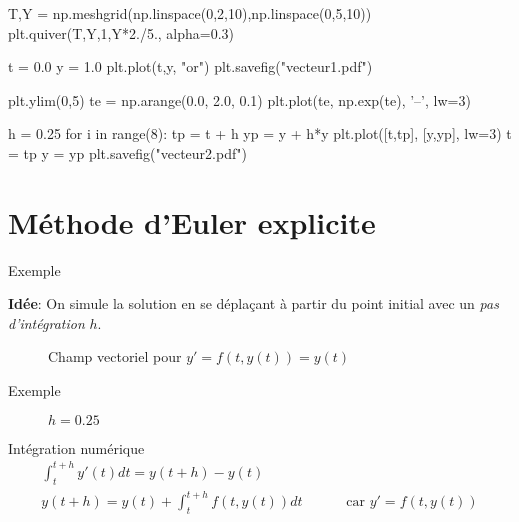 \documentclass{beamer}
\begin{document}
\begin{pycode}
    T,Y = np.meshgrid(np.linspace(0,2,10),np.linspace(0,5,10))
    plt.quiver(T,Y,1,Y*2./5., alpha=0.3)

    t = 0.0
    y = 1.0
    plt.plot(t,y, "or")
    plt.savefig("vecteur1.pdf")

    plt.ylim(0,5)
    te = np.arange(0.0, 2.0, 0.1)
    plt.plot(te, np.exp(te), '--', lw=3)

    h = 0.25
    for i in range(8):
        tp = t + h
        yp = y + h*y
        plt.plot([t,tp], [y,yp], lw=3)
        t = tp
        y = yp
    plt.savefig("vecteur2.pdf")
\end{pycode}

\section{Méthode d'Euler explicite}

\begin{frame}{Exemple}

    \textbf{Idée}: On simule la solution en se déplaçant à partir du point initial avec un \emph{pas d'intégration} $h$.

    \begin{figure}
        \caption{Champ vectoriel pour $y'= f(t,y(t)) = y(t)$}
    \end{figure}
\end{frame}

\begin{frame}{Exemple}
    \begin{figure}
        \caption{$h=0.25$}
    \end{figure}
\end{frame}


\begin{frame}{Intégration numérique}
    \begin{align*}
        \int_t^{t+h} y'(t) dt = y(t+h) - y(t)     &                                     \\
        y(t+h) = y(t) + \int_t^{t+h} f(t,y(t)) dt & \qquad \text{ car } y' = f(t, y(t)) \\
    \end{align*}
\end{frame}
\end{document}
